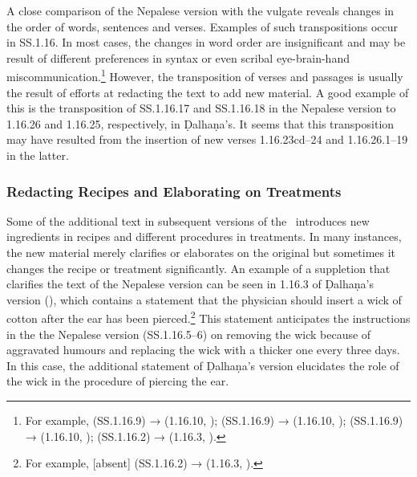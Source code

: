 A close comparison of the Nepalese version with the vulgate reveals changes in the 
order of words, sentences and verses. Examples of such transpositions occur in SS.1.16. In 
most cases, the changes in word order are insignificant and may be result of different 
preferences in syntax or even scribal eye-brain-hand miscommunication.\footnote{For 
example,  (SS.1.16.9) →  (1.16.10, \cite[77]{vulgate}); 
 (SS.1.16.9) →  (1.16.10, 
\cite[77]{vulgate});  (SS.1.16.9) → 
 (1.16.10, \cite[77]{vulgate}); 
(SS.1.16.2) →  (1.16.3, \cite[76]{vulgate}).} However, the transposition of verses and 
passages is usually the result of efforts at redacting the text to add new material. A good 
example of this is the transposition of SS.1.16.17 and SS.1.16.18 in the Nepalese version to 
1.16.26 and 1.16.25, respectively, in Ḍalhaṇa's. It seems that this transposition may have 
resulted from the insertion of new verses 1.16.23cd–24 and 1.16.26.1–19 in the latter.


%
\subsubsection{Redacting Recipes and Elaborating on Treatments}

Some of the additional text in subsequent versions of the \SS\ introduces new
ingredients in recipes and different procedures in treatments. In many instances,
the new material merely clarifies or elaborates on the original but sometimes it
changes the recipe or treatment significantly. An example of a suppletion that
clarifies the text of the Nepalese version can be seen in 1.16.3 of Ḍalhaṇa's
version (\cite[76]{vulgate}), which contains a statement that the physician should
insert a wick of cotton after the ear has been pierced.\footnote{For example,
    [absent] (SS.1.16.2) →  (1.16.3, \cite[76]{vulgate}).}
    This statement anticipates the instructions in the the Nepalese version
    (SS.1.16.5–6) on removing the wick because of aggravated humours and replacing the
    wick with a thicker one every three days. In this case, the additional statement
    of Ḍalhaṇa's version elucidates the role of the wick in the procedure of piercing
    the ear.

